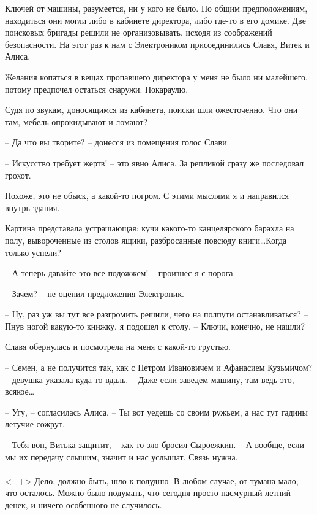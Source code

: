 \documentclass[a4paper]{book}
\begin{document}
Ключей от машины, разумеется, ни у кого не было. По общим предположениям, находиться они могли либо в кабинете директора, либо где-то в его домике. Две поисковых бригады решили не организовывать, исходя из соображений безопасности. На этот раз к нам с Электроником присоединились Славя, Витек и Алиса.

Желания копаться в вещах пропавшего директора у меня не было ни малейшего, потому предпочел остаться снаружи. Покараулю.

Судя по звукам, доносящимся из кабинета, поиски шли ожесточенно. Что они там, мебель опрокидывают и ломают?

-- Да что вы творите? -- донесся из помещения голос Слави.

-- Искусство требует жертв! -- это явно Алиса. За репликой сразу же последовал грохот.

Похоже, это не обыск, а какой-то погром. С этими мыслями я и направился внутрь здания. 

Картина представала устрашающая: кучи какого-то канцелярского барахла на полу, вывороченные из столов ящики, разбросанные повсюду книги\ldots Когда только успели?

-- А теперь давайте это все подожжем! -- произнес я с порога.

-- Зачем? -- не оценил предложения Электроник.

-- Ну, раз уж вы тут все разгромить решили, чего на полпути останавливаться? -- Пнув ногой какую-то книжку, я подошел к столу. -- Ключи, конечно, не нашли?

Славя обернулась и посмотрела на меня с какой-то грустью.

-- Семен, а не получится так, как с Петром Ивановичем и Афанасием Кузьмичом? -- девушка указала куда-то вдаль. -- Даже если заведем машину, там ведь это, всякое\ldots

-- Угу, -- согласилась Алиса. -- Ты вот уедешь со своим ружьем, а нас тут гадины летучие сожрут. 

-- Тебя вон, Витька защитит, -- как-то зло бросил Сыроежкин. -- А вообще, если мы их передачу слышим, значит и нас услышат. Связь нужна.


\paragraph{}<++>
Дело, должно быть, шло к полудню. В любом случае, от тумана мало, что осталось. Можно было подумать, что сегодня просто пасмурный летний денек, и ничего особенного не случилось. 
\end{document}
